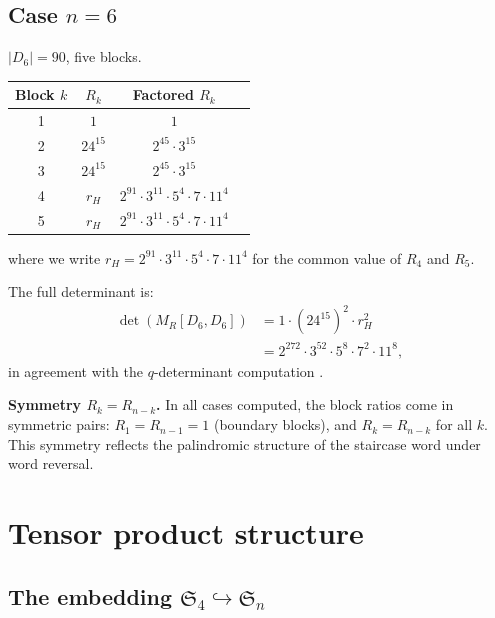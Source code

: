 \documentclass[11pt]{article}
\theoremstyle{definition}
\theoremstyle{remark}
\newcommand{\Sym}{\mathfrak{S}}
\begin{document}
\subsection{Case $n = 6$}

$|D_6| = 90$, five blocks.

\begin{center}
\begin{tabular}{cccc}
\toprule
Block $k$ & $R_k$ & Factored $R_k$ \\
\midrule
1 & $1$ & $1$ \\
2 & $24^{15}$ & $2^{45} \cdot 3^{15}$ \\
3 & $24^{15}$ & $2^{45} \cdot 3^{15}$ \\
4 & $r_H$ & $2^{91} \cdot 3^{11} \cdot 5^4 \cdot 7 \cdot 11^4$ \\
5 & $r_H$ & $2^{91} \cdot 3^{11} \cdot 5^4 \cdot 7 \cdot 11^4$ \\
\bottomrule
\end{tabular}
\end{center}

where we write $r_H = 2^{91} \cdot 3^{11} \cdot 5^4 \cdot 7 \cdot 11^4$
for the common value of $R_4$ and $R_5$.

The full determinant is:
\begin{align*}
  \det(M_R[D_6, D_6])
  &= 1 \cdot (24^{15})^2 \cdot r_H^2 \\
  &= 2^{272} \cdot 3^{52} \cdot 5^8 \cdot 7^2 \cdot 11^8,
\end{align*}
in agreement with the $q$-determinant computation \cite{Clio-qDet}.

\medskip
\noindent
\textbf{Symmetry $R_k = R_{n-k}$.}  In all cases computed, the block
ratios come in symmetric pairs: $R_1 = R_{n-1} = 1$ (boundary blocks),
and $R_k = R_{n-k}$ for all $k$.  This symmetry reflects the palindromic
structure of the staircase word under word reversal.

\section{Tensor product structure}\label{sec:tensor}

\subsection{The embedding $\Sym_4 \hookrightarrow \Sym_n$}
\end{document}
